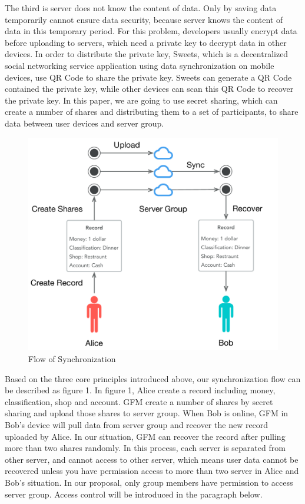 \documentclass[twocolumn,10pt]{article}
\begin{document}
The third is server does not know the content of data. Only by saving data temporarily cannot ensure data security, because server knows the content of data in this temporary period. For this problem, developers usually encrypt data before uploading to servers, which need a private key to decrypt data in other devices. In order to distribute the private key, Sweets, which is a decentralized social networking service application using data synchronization on mobile devices, use QR Code to share the private key. Sweets can generate a QR Code contained the private key, while other devices can scan this QR Code to recover the private key. In this paper, we are going to use secret sharing, which can create a number of shares and distributing them to a set of participants\cite{smith2013layered}, to share data between user devices and server group.

\begin{figure}[t]
\centering
\includegraphics[scale=0.4]{sync_flow}
\caption{Flow of Synchronization}
\end{figure}
Based on the three core principles introduced above, our synchronization flow can be described as figure 1. In figure 1, Alice create a record including money, classification, shop and account. GFM create a number of shares by secret sharing and upload those shares to server group. When Bob is online, GFM in Bob's device will pull data from server group and recover the new record uploaded by Alice. In our situation, GFM can recover the record after pulling more than two shares randomly. In this process, each server is separated from other server, and cannot access to other server, which means user data cannot be recovered unless you have permission access to more than two server in Alice and Bob's situation. In our proposal, only group members have permission to access server group. Access control will be introduced in the paragraph below.
\end{document}
